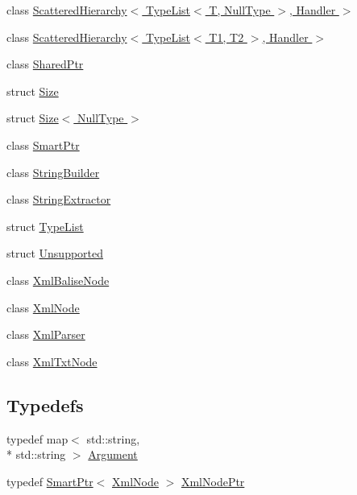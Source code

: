 \begin{DoxyCompactItemize}
\item 
class \hyperlink{class_agmd_utilities_1_1_scattered_hierarchy_3_01_type_list_3_01_t_00_01_null_type_01_4_00_01_handler_01_4}{Scattered\+Hierarchy$<$ Type\+List$<$ T, Null\+Type $>$, Handler $>$}
\item 
class \hyperlink{class_agmd_utilities_1_1_scattered_hierarchy_3_01_type_list_3_01_t1_00_01_t2_01_4_00_01_handler_01_4}{Scattered\+Hierarchy$<$ Type\+List$<$ T1, T2 $>$, Handler $>$}
\item 
class \hyperlink{class_agmd_utilities_1_1_shared_ptr}{Shared\+Ptr}
\item 
struct \hyperlink{struct_agmd_utilities_1_1_size}{Size}
\item 
struct \hyperlink{struct_agmd_utilities_1_1_size_3_01_null_type_01_4}{Size$<$ Null\+Type $>$}
\item 
class \hyperlink{class_agmd_utilities_1_1_smart_ptr}{Smart\+Ptr}
\item 
class \hyperlink{class_agmd_utilities_1_1_string_builder}{String\+Builder}
\item 
class \hyperlink{class_agmd_utilities_1_1_string_extractor}{String\+Extractor}
\item 
struct \hyperlink{struct_agmd_utilities_1_1_type_list}{Type\+List}
\item 
struct \hyperlink{struct_agmd_utilities_1_1_unsupported}{Unsupported}
\item 
class \hyperlink{class_agmd_utilities_1_1_xml_balise_node}{Xml\+Balise\+Node}
\item 
class \hyperlink{class_agmd_utilities_1_1_xml_node}{Xml\+Node}
\item 
class \hyperlink{class_agmd_utilities_1_1_xml_parser}{Xml\+Parser}
\item 
class \hyperlink{class_agmd_utilities_1_1_xml_txt_node}{Xml\+Txt\+Node}
\end{DoxyCompactItemize}
\subsection*{Typedefs}
\begin{DoxyCompactItemize}
\item 
typedef map$<$ std\+::string, \\*
std\+::string $>$ \hyperlink{namespace_agmd_utilities_a93ce0bfe1d978003fb0319f5b3763e2c}{Argument}
\item 
typedef \hyperlink{class_agmd_utilities_1_1_smart_ptr}{Smart\+Ptr}$<$ \hyperlink{class_agmd_utilities_1_1_xml_node}{Xml\+Node} $>$ \hyperlink{namespace_agmd_utilities_a5c62c53e06995bf0eddd56b55f44e62e}{Xml\+Node\+Ptr}
\end{DoxyCompactItemize}
